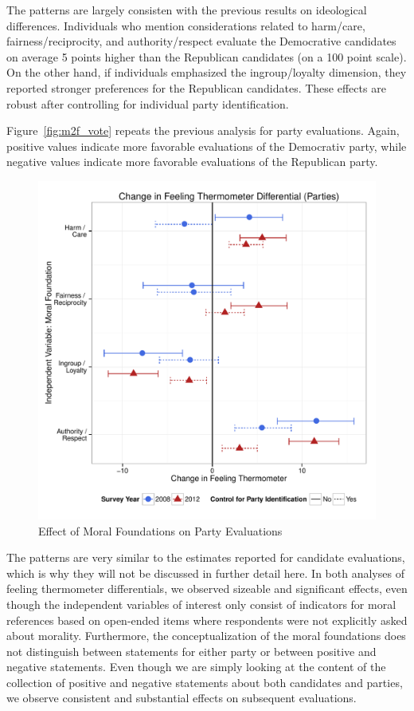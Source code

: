 \documentclass[12pt]{article}
\begin{document}
The patterns are largely consisten with the previous results on ideological differences. Individuals who mention considerations related to harm/care, fairness/reciprocity, and authority/respect evaluate the Democrative candidates on average 5 points higher than the Republican candidates (on a 100 point scale). On the other hand, if individuals emphasized the ingroup/loyalty dimension, they reported stronger preferences for the Republican candidates. These effects are robust after controlling for individual party identification.

Figure~\ref{fig:m2f_vote} repeats the previous analysis for party evaluations. Again, positive values indicate more favorable evaluations of the Democrativ party, while negative values indicate more favorable evaluations of the Republican party.

\begin{figure}[ht]\centering
\includegraphics[scale=.5]{../calc/fig/m2f_vote.pdf}
\caption{Effect of Moral Foundations on Party Evaluations}\label{fig:m2g_vote}
\end{figure}

The patterns are very similar to the estimates reported for candidate evaluations, which is why they will not be discussed in further detail here. In both analyses of feeling thermometer differentials, we observed sizeable and significant effects, even though the independent variables of interest only consist of indicators for moral references based on open-ended items where respondents were not explicitly asked about morality. Furthermore, the conceptualization of the moral foundations does not distinguish between statements for either party or between positive and negative statements. Even though we are simply looking at the content of the collection of positive and negative statements about both candidates and parties, we observe consistent and substantial effects on subsequent evaluations.
\end{document}
